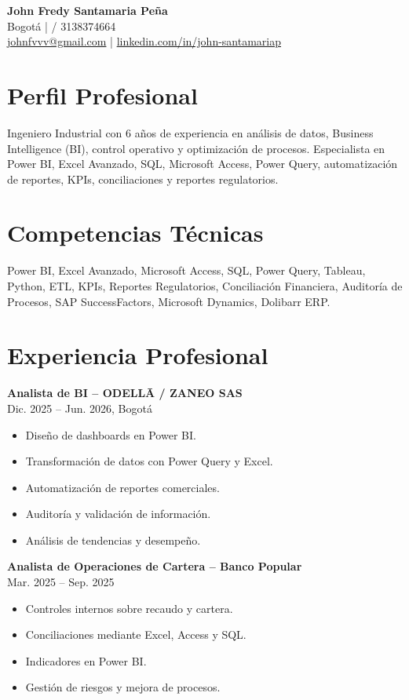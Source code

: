 \documentclass[11pt]{article}
\begin{document}
\begin{center}
{\LARGE \textbf{John Fredy Santamaria Peña}}\\
Bogotá \quad |  / 3138374664\\
\href{mailto:johnfvvv@gmail.com}{johnfvvv@gmail.com} \quad | \quad
\href{https://linkedin.com/in/john-santamariap}{linkedin.com/in/john-santamariap}
\end{center}

\section*{Perfil Profesional}
Ingeniero Industrial con 6 años de experiencia en análisis de datos, Business Intelligence (BI), control operativo y optimización de procesos. Especialista en Power BI, Excel Avanzado, SQL, Microsoft Access, Power Query, automatización de reportes, KPIs, conciliaciones y reportes regulatorios.

\section*{Competencias Técnicas}
Power BI, Excel Avanzado, Microsoft Access, SQL, Power Query, Tableau, Python, ETL, KPIs, Reportes Regulatorios, Conciliación Financiera, Auditoría de Procesos, SAP SuccessFactors, Microsoft Dynamics, Dolibarr ERP.

\section*{Experiencia Profesional}

\textbf{Analista de BI -- ODELLĀ / ZANEO SAS}\\
Dic. 2025 -- Jun. 2026, Bogotá
\begin{itemize}[leftmargin=*]
\item Diseño de dashboards en Power BI.
\item Transformación de datos con Power Query y Excel.
\item Automatización de reportes comerciales.
\item Auditoría y validación de información.
\item Análisis de tendencias y desempeño.
\end{itemize}

\textbf{Analista de Operaciones de Cartera -- Banco Popular}\\
Mar. 2025 -- Sep. 2025
\begin{itemize}[leftmargin=*]
\item Controles internos sobre recaudo y cartera.
\item Conciliaciones mediante Excel, Access y SQL.
\item Indicadores en Power BI.
\item Gestión de riesgos y mejora de procesos.
\end{itemize}
\end{document}
